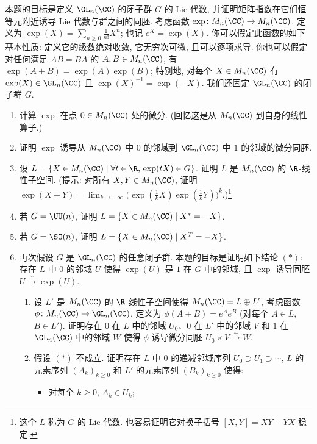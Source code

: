 \begin{exercise}
\label{ex:I.5.5.4}
本题的目标是定义 $\GL_n(\CC)$ 的闭子群 $G$ 的 Lie 代数, 并证明矩阵指数在它们恒等元附近诱导 Lie 代数与群之间的同胚.
考虑函数 $\exp \colon M_n(\CC) \to M_n(\CC)$, 定义为 $\exp(X) = \sum_{n \geq 0}\frac{1}{n!}X^n$; 也记 $e^X = \exp(X)$. 你可以假定此函数的如下基本性质: 定义它的级数绝对收敛, 它无穷次可微, 且可以逐项求导. 你也可以假定对任何满足 $AB = BA$ 的 $A, B \in M_n(\CC)$, 有 $\exp(A + B) = \exp(A)\exp(B)$; 特别地, 对每个 $X \in M_n(\CC)$ 有 $\exp(X) \in \GL_n(\CC)$ 且 $\exp(X)^{-1} = \exp(-X)$.
我们还固定 $\GL_n(\CC)$ 的闭子群 $G$.
\begin{enumerate}
\item[(a)] 计算 $\exp$ 在点 $0 \in M_n(\CC)$ 处的微分. (回忆这是从 $M_n(\CC)$ 到自身的线性算子.)
\item[(b)] 证明 $\exp$ 诱导从 $M_n(\CC)$ 中 $0$ 的邻域到 $\GL_n(\CC)$ 中 $1$ 的邻域的微分同胚.
\item[(c)] 设 $L = \{X \in M_n(\CC) \mid \forall t \in \R,\, \exp(tX) \in G\}$. 证明 $L$ 是 $M_n(\CC)$ 的 $\R$-线性子空间. (提示: 对所有 $X, Y \in M_n(\CC)$, 证明 $\exp(X + Y) = \lim_{k \to +\infty}\bigl(\exp(\frac{1}{k}X)\exp(\frac{1}{k}Y)\bigr)^k$.)\footnote{这个 $L$ 称为 $G$ 的 Lie 代数. 也容易证明它对换子括号 $[X, Y] = XY - YX$ 稳定.}
\item[(d)] 若 $G = \UU(n)$, 证明 $L = \{X \in M_n(\CC) \mid X^* = -X\}$.
\item[(e)] 若 $G = \SO(n)$, 证明 $L = \{X \in M_n(\CC) \mid X^T = -X\}$.
\item[(f)] 再次假设 $G$ 是 $\GL_n(\CC)$ 的任意闭子群. 本题的目标是证明如下结论 $(*)$: 存在 $L$ 中 $0$ 的邻域 $U$ 使得 $\exp(U)$ 是 $1$ 在 $G$ 中的邻域, 且 $\exp$ 诱导同胚 $U \xrightarrow{\sim} \exp(U)$.
  \begin{enumerate}
  \item[(i)] 设 $L'$ 是 $M_n(\CC)$ 的 $\R$-线性子空间使得 $M_n(\CC) = L \oplus L'$, 考虑函数 $\phi \colon M_n(\CC) \to \GL_n(\CC)$, 定义为 $\phi(A + B) = e^Ae^B$ (对每个 $A \in L$, $B \in L'$). 证明存在 $0$ 在 $L$ 中的邻域 $U_0$、$0$ 在 $L'$ 中的邻域 $V$ 和 $1$ 在 $\GL_n(\CC)$ 中的邻域 $W$ 使得 $\phi$ 诱导微分同胚 $U_0 \times V \xrightarrow{\sim} W$.
  \item[(ii)] 假设 $(*)$ 不成立. 证明存在 $L$ 中 $0$ 的递减邻域序列 $U_0 \supset U_1 \supset \cdots$, $L$ 的元素序列 $(A_k)_{k \geq 0}$ 和 $L'$ 的元素序列 $(B_k)_{k \geq 0}$ 使得:
  \begin{itemize}
  \item 对每个 $k \geq 0$, $A_k \in U_k$;

\end{itemize}
\end{enumerate}
\end{enumerate}
\end{exercise}
